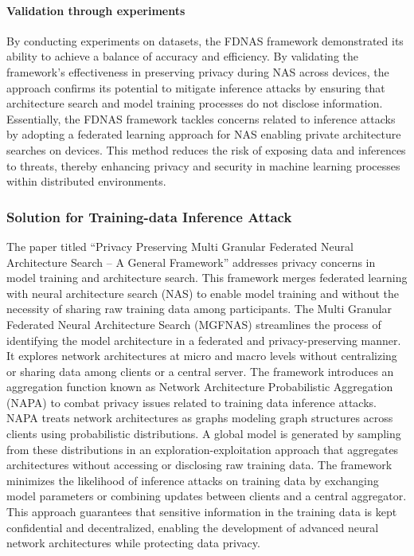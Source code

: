 \documentclass[conference]{IEEEtran}
\begin{document}
\paragraph{Validation through experiments} By conducting experiments on datasets, the FDNAS framework demonstrated its ability to achieve a balance of accuracy and efficiency. By validating the framework's effectiveness in preserving privacy during NAS across devices, the approach confirms its potential to mitigate inference attacks by ensuring that architecture search and model training processes do not disclose information.
Essentially, the FDNAS framework tackles concerns related to inference attacks by adopting a federated learning approach for NAS enabling private architecture searches on devices. This method reduces the risk of exposing data and inferences to threats, thereby enhancing privacy and security in machine learning processes within distributed environments.

\subsubsection{\textbf{Solution for Training-data Inference Attack}}
The paper titled \enquote{Privacy Preserving Multi Granular Federated Neural Architecture Search – A General Framework} addresses privacy concerns in model training and architecture search. This framework merges federated learning with neural architecture search (NAS) to enable model training and without the necessity of sharing raw training data among participants. The Multi Granular Federated Neural Architecture Search (MGFNAS) streamlines the process of identifying the model architecture in a federated and privacy-preserving manner. It explores network architectures at micro and macro levels without centralizing or sharing data among clients or a central server.
The framework introduces an aggregation function known as Network Architecture Probabilistic Aggregation (NAPA) to combat privacy issues related to training data inference attacks. NAPA treats network architectures as graphs modeling graph structures across clients using probabilistic distributions. A global model is generated by sampling from these distributions in an exploration-exploitation approach that aggregates architectures without accessing or disclosing raw training data. The framework minimizes the likelihood of inference attacks on training data by exchanging model parameters or combining updates between clients and a central aggregator. This approach guarantees that sensitive information in the training data is kept confidential and decentralized, enabling the development of advanced neural network architectures while protecting data privacy.
\end{document}
